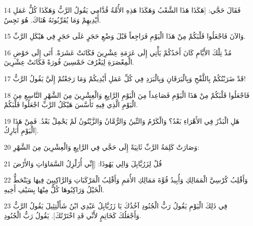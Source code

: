 \par 14 فَقَالَ حَجَّي: [هَكَذَا هَذَا الشَّعْبُ وَهَكَذَا هَذِهِ الأُمَّةُ قُدَّامِي يَقُولُ الرَّبُّ وَهَكَذَا كُلُّ عَمَلِ أَيْدِيهِمْ وَمَا يُقَرِّبُونَهُ هُنَاكَ. هُوَ نَجِسٌ.
\par 15 وَالآنَ فَاجْعَلُوا قَلْبَكُمْ مِنْ هَذَا الْيَوْمِ فَرَاجِعاً قَبْلَ وَضْعِ حَجَرٍ عَلَى حَجَرٍ فِي هَيْكَلِ الرَّبِّ.
\par 16 مُذْ تِلْكَ الأَيَّامِ كَانَ أَحَدُكُمْ يَأْتِي إِلَى عَرَمَةِ عِشْرِينَ فَكَانَتْ عَشَرَةً. أَتَى إِلَى حَوْضِ الْمِعْصَرَةِ لِيَغْرُفَ خَمْسِينَ فُورَةً فَكَانَتْ عِشْرِينَ.
\par 17 قَدْ ضَرَبْتُكُمْ بِاللَّفْحِ وَبِالْيَرَقَانِ وَبِالْبَرَدِ فِي كُلِّ عَمَلِ أَيْدِيكُمْ وَمَا رَجَعْتُمْ إِلَيَّ يَقُولُ الرَّبُّ!
\par 18 فَاجْعَلُوا قَلْبَكُمْ مِنْ هَذَا الْيَوْمِ فَصَاعِداً مِنَ الْيَوْمِ الرَّابِعِ وَالْعِشْرِينَ مِنَ الشَّهْرِ التَّاسِعِ مِنَ الْيَوْمِ الَّذِي فِيهِ تَأَسَّسَ هَيْكَلُ الرَّبِّ اجْعَلُوا قَلْبَكُمْ.
\par 19 هَلِ الْبَذْرُ فِي الأَهْرَاءِ بَعْدُ؟ وَالْكَرْمُ وَالتِّينُ وَالرُّمَّانُ وَالزَّيْتُونُ لَمْ يَحْمِلْ بَعْدُ. فَمِنْ هَذَا الْيَوْمِ أُبَارِكُ].
\par 20 وَصَارَتْ كَلِمَةُ الرَّبِّ ثَانِيَةً إِلَى حَجَّي فِي الرَّابِعِ وَالْعِشْرِينَ مِنَ الشَّهْرِ:
\par 21 قُلْ لِزَرُبَّابِلَ وَالِي يَهُوذَا: [إِنِّي أُزَلْزِلُ السَّمَاوَاتِ وَالأَرْضَ
\par 22 وَأَقْلِبُ كُرْسِيَّ الْمَمَالِكِ وَأُبِيدُ قُوَّةَ مَمَالِكِ الأُمَمِ وَأَقْلِبُ الْمَرْكَبَاتِ وَالرَّاكِبِينَ فِيهَا وَيَنْحَطُّ الْخَيْلُ وَرَاكِبُوهَا كُلٌّ مِنْهَا بِسَيْفِ أَخِيهِ.
\par 23 فِي ذَلِكَ الْيَوْمِ يَقُولُ رَبُّ الْجُنُودِ آخُذُكَ يَا زَرُبَّابِلُ عَبْدِي ابْنُ شَأَلْتِئِيلَ يَقُولُ الرَّبُّ وَأَجْعَلُكَ كَخَاتِمٍ لأَنِّي قَدِ اخْتَرْتُكَ]. يَقُولُ رَبُّ الْجُنُودِ.


